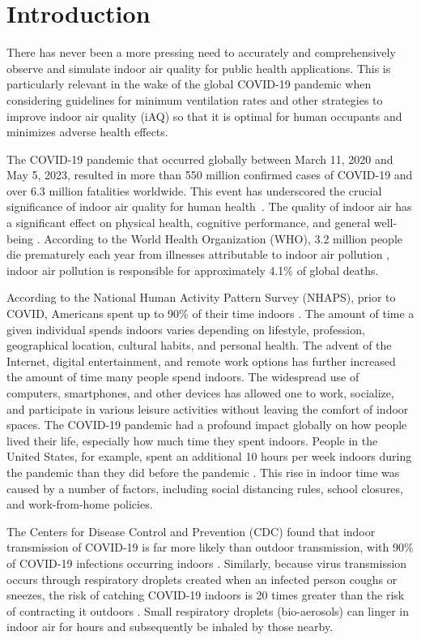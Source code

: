 \documentclass[journal=jacsat,manuscript=article]{achemso}
\begin{document}
\section{Introduction}
There has never been a more pressing need to accurately and comprehensively observe and simulate indoor air quality for public health applications. This is particularly relevant  in the wake of the global COVID-19 pandemic when considering guidelines for minimum ventilation rates and other strategies to improve indoor air quality (iAQ) so that it is optimal for human occupants and minimizes adverse health effects.

The COVID-19 pandemic that occurred globally between March 11, 2020 and May 5, 2023, resulted in more than 550 million confirmed cases of COVID-19 and over 6.3 million fatalities worldwide. This event has underscored the crucial significance of indoor air quality for human \hbox{health \citep{who_pandemic}}. The quality of indoor air has a significant effect on physical health, cognitive performance, and general well-being \citep{Krebs2021AirPC, Gao2021ShorttermAP, Carneiro2021TheEO, Ni2021AssociationsOP, Shehab2019EffectsOS}. According to the World Health Organization (WHO), 3.2 million people die prematurely each year from illnesses attributable to indoor air pollution \citep{who2021indoor}, indoor air pollution is responsible for approximately 4.1\% of global deaths. 

According to the National Human Activity Pattern Survey (NHAPS), prior to COVID, Americans spent up to 90\% of their time indoors \citep{klepeis2001}.  The amount of time a given individual spends indoors varies depending on lifestyle, profession, geographical location, cultural habits, and personal health. The advent of the Internet, digital entertainment, and remote work options has further increased the amount of time many people spend indoors. The widespread use of computers, smartphones, and other devices has allowed one to work, socialize, and participate in various leisure activities without leaving the comfort of indoor spaces.  The COVID-19 pandemic had a profound impact globally on how people lived their life, especially how much time they spent indoors. People in the United States, for example, spent an additional 10 hours per week indoors during the pandemic than they did before the pandemic \citep{oxford_study}. This rise in indoor time was caused by a number of factors, including social distancing rules, school closures, and work-from-home policies.

The Centers for Disease Control and Prevention (CDC) found that indoor transmission of COVID-19 is far more likely than outdoor transmission, with 90\% of COVID-19 infections occurring indoors \citep{cdc_indoor_transmission}. Similarly, because virus transmission occurs through respiratory droplets created when an infected person coughs or sneezes, the risk of catching \hbox{COVID-19} indoors is 20 times greater than the risk of contracting it outdoors \citep{ucsf_indoor_transmission}. Small respiratory droplets (bio-aerosols) can linger in indoor air for hours and subsequently be inhaled by those nearby. 
\end{document}
